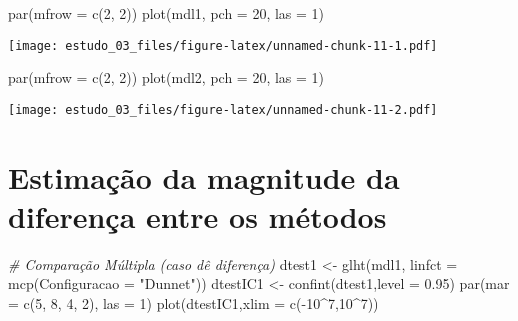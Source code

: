 \documentclass[
]{article}
\newenvironment{Shaded}{\begin{snugshade}}{\end{snugshade}}
\newcommand{\AttributeTok}[1]{\textcolor[rgb]{0.77,0.63,0.00}{#1}}
\newcommand{\CommentTok}[1]{\textcolor[rgb]{0.56,0.35,0.01}{\textit{#1}}}
\newcommand{\DecValTok}[1]{\textcolor[rgb]{0.00,0.00,0.81}{#1}}
\newcommand{\FloatTok}[1]{\textcolor[rgb]{0.00,0.00,0.81}{#1}}
\newcommand{\FunctionTok}[1]{\textcolor[rgb]{0.00,0.00,0.00}{#1}}
\newcommand{\NormalTok}[1]{#1}
\newcommand{\OtherTok}[1]{\textcolor[rgb]{0.56,0.35,0.01}{#1}}
\newcommand{\SpecialCharTok}[1]{\textcolor[rgb]{0.00,0.00,0.00}{#1}}
\newcommand{\StringTok}[1]{\textcolor[rgb]{0.31,0.60,0.02}{#1}}
\begin{document}
\begin{Shaded}
\begin{Highlighting}[]
\FunctionTok{par}\NormalTok{(}\AttributeTok{mfrow =} \FunctionTok{c}\NormalTok{(}\DecValTok{2}\NormalTok{, }\DecValTok{2}\NormalTok{))}
\FunctionTok{plot}\NormalTok{(mdl1, }\AttributeTok{pch =} \DecValTok{20}\NormalTok{, }\AttributeTok{las =} \DecValTok{1}\NormalTok{)}
\end{Highlighting}
\end{Shaded}

\texttt{[image: estudo\_03\_files/figure-latex/unnamed-chunk-11-1.pdf]}

\begin{Shaded}
\begin{Highlighting}[]
\FunctionTok{par}\NormalTok{(}\AttributeTok{mfrow =} \FunctionTok{c}\NormalTok{(}\DecValTok{2}\NormalTok{, }\DecValTok{2}\NormalTok{))}
\FunctionTok{plot}\NormalTok{(mdl2, }\AttributeTok{pch =} \DecValTok{20}\NormalTok{, }\AttributeTok{las =} \DecValTok{1}\NormalTok{)}
\end{Highlighting}
\end{Shaded}

\texttt{[image: estudo\_03\_files/figure-latex/unnamed-chunk-11-2.pdf]}

\hypertarget{estimauxe7uxe3o-da-magnitude-da-diferenuxe7a-entre-os-muxe9todos}{%
\section{Estimação da magnitude da diferença entre os
métodos}\label{estimauxe7uxe3o-da-magnitude-da-diferenuxe7a-entre-os-muxe9todos}}

\begin{Shaded}
\begin{Highlighting}[]
\CommentTok{\# Comparação Múltipla (caso dê diferença)}
\NormalTok{dtest1 }\OtherTok{\textless{}{-}} \FunctionTok{glht}\NormalTok{(mdl1, }\AttributeTok{linfct =} \FunctionTok{mcp}\NormalTok{(}\AttributeTok{Configuracao =} \StringTok{"Dunnet"}\NormalTok{))}
\NormalTok{dtestIC1 }\OtherTok{\textless{}{-}} \FunctionTok{confint}\NormalTok{(dtest1,}\AttributeTok{level =} \FloatTok{0.95}\NormalTok{)}
\FunctionTok{par}\NormalTok{(}\AttributeTok{mar =} \FunctionTok{c}\NormalTok{(}\DecValTok{5}\NormalTok{, }\DecValTok{8}\NormalTok{, }\DecValTok{4}\NormalTok{, }\DecValTok{2}\NormalTok{), }\AttributeTok{las =} \DecValTok{1}\NormalTok{)}
\FunctionTok{plot}\NormalTok{(dtestIC1,}\AttributeTok{xlim =} \FunctionTok{c}\NormalTok{(}\SpecialCharTok{{-}}\DecValTok{10}\SpecialCharTok{\^{}}\DecValTok{7}\NormalTok{,}\DecValTok{10}\SpecialCharTok{\^{}}\DecValTok{7}\NormalTok{))}
\end{Highlighting}
\end{Shaded}
\end{document}
